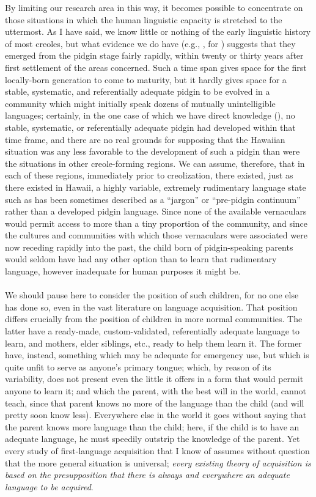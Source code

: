 By limiting our research area in this way, it becomes possible to concentrate on those situations in which the human linguistic capacity is stretched to the uttermost. As I have said, we know little or nothing of the early linguistic history of most creoles, but what evidence we do have (e.g., \citealt{Rens1953}, for ) suggests that they emerged from the pidgin stage fairly rapidly, within twenty or thirty years after first settlement of the areas concerned. Such a time span gives space for the first locally-born generation to come to maturity, but it hardly gives space for a stable, systematic, and referentially adequate pidgin to be evolved in a community which might initially speak dozens of mutually unintelligible languages; certainly, in the one case of which we have direct knowledge (), no stable, systematic, or referentially
adequate pidgin had developed within that time frame, and there are no real grounds for supposing that the Hawaiian situation was any less favorable to the development of such a pidgin than were the situations in other creole-forming regions. We can assume, therefore, that in each of these regions, immediately prior to creolization, there existed, just as there existed in Hawaii, a highly variable, extremely rudimentary language state such as has been sometimes described as a ``jargon'' or ``pre-pidgin continuum'' rather than a developed pidgin language. Since none of the available vernaculars would permit access to more than a tiny proportion of the community, and since the cultures and communities with which those vernaculars were associated were now receding rapidly into the past, the child born of pidgin-speaking parents would seldom have had any other option than to learn that rudi\-mentary language, however inadequate for human purposes it might be.\\\\


We should pause here to consider the position of such children, for no one else has done so, even in the vast literature on language acquisition. That position differs crucially from the position of children in more normal communities. The latter have a ready-made, custom-validated, referentially adequate language to learn, and mothers, elder siblings, etc., ready to help them learn it. The former have, instead, something which may be adequate for emergency use, but which is quite unfit to serve as anyone's primary tongue; which, by reason of its variability, does not present even the little it offers in a form that would permit anyone to learn it; and which the parent, with the best will in the world, cannot teach, since that parent knows no more of the language than the child (and will pretty soon know less). Every\-where else in the world it goes without saying that the parent knows more language than the child; here, if the child is to have an adequate language, he must speedily outstrip the knowledge of the parent. Yet every study of first-language acquisition that I know of assumes without question that the more general situation is universal; \textit{every existing theory of acquisition is based on the presupposition that there is always and everywhere an adequate language to be acquired}.

